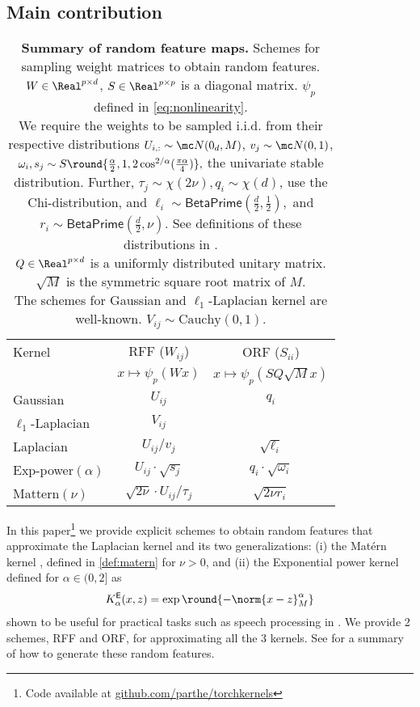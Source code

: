 \documentclass{article}
\def\matern{Mat\'ern\,}
\def\cite{\citep}
\theoremstyle{plain}
\begin{document}
\subsection{Main contribution}

\begin{table}
    \centering
    \begin{tabular}{lcc}
    \toprule
    Kernel &  RFF ($W_{ij}$) & ORF ($S_{ii}$)\\
    & $x\mapsto\psi_p(Wx)$
    & $x\mapsto\psi_p(SQ\sqrt{M}x)$\\
    \midrule
    Gaussian 
    & $U_{ij}$ 
    & $q_i$
    \\
    $\ell_1$-Laplacian
    & $V_{ij}$
    & 
    \\
    \midrule
    Laplacian 
    & $U_{ij}/v_j$
    & $\sqrt{\ell_i}$
    \\
    Exp-power$(\alpha)$
    & $U_{ij}\cdot \sqrt{s_j}$
    & $q_i\cdot\sqrt{\omega_i}$
    \\
    Mattern$(\nu)$
    & $\sqrt{2\nu}\cdot U_{ij}/\tau_j$
    & $\sqrt{2\nu r_i}$
    \\
    \bottomrule
    \end{tabular}
    \caption{\label{tab:summary}\normalsize\textbf{Summary of random feature maps.}
    Schemes for sampling weight matrices to obtain random features. 
    $W\in\Real^{p\times d}$,  $S\in\Real^{p\times p}$ is a diagonal matrix. $\psi_p$ defined in \cref{eq:nonlinearity}.\\
    We require the weights to be sampled i.i.d. from their respective distributions $U_{i,:}\sim\mc N(0_d,M)$, $v_j\sim\mc N(0,1)$, $\omega_i,s_j\sim S\round{\tfrac{\alpha}{2}, 1,2\cos^{2/\alpha}(\tfrac{\pi\alpha}{4})},$ the univariate stable distribution. Further, $\tau_j \sim \chi(2\nu), q_i \sim \chi(d)$, use the Chi-distribution, and $ \ell_i \sim\textsf{BetaPrime}(\tfrac{d}{2}, \tfrac{1}{2}),$ and $r_i \sim\textsf{BetaPrime}(\tfrac{d}{2},\nu)$. See definitions of these distributions in .\\ 
    $Q\in\Real^{p\times d}$ is a uniformly distributed unitary matrix. $\sqrt{M}$ is the symmetric square root matrix of $M.$\\
    The schemes for Gaussian and $\ell_1$-Laplacian kernel are well-known. $V_{ij}\sim\text{Cauchy}(0,1)$.
    }
\end{table}

In this paper\footnote[3]{Code available at \href{https://github.com/parthe/torchkernels}{github.com/parthe/torchkernels}
} we provide explicit schemes to obtain random features that approximate the Laplacian kernel and its two generalizations: (i) the \matern kernel \cite{williams2006gaussian}, defined in \cref{def:matern} for $\nu>0$, and (ii) the Exponential power  kernel defined for $\alpha\in(0,2]$ as 
\begin{align}
    \label{def:exp-power}
    K^{\textsf{E}}_\alpha(x,z)=\exp\round{-\norm{x-z}_M^\alpha}
\end{align}
shown to be useful for practical tasks such as speech processing in 
\cite{Hui2018KernelMB}. We provide 2 schemes, RFF and ORF, for approximating all the 3 kernels. See  for a summary of how to generate these random features.
\end{document}
